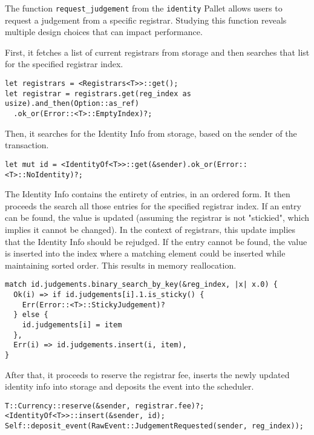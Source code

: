 \documentclass[11pt,a4paper]{article}
\begin{document}
The function \verb|request_judgement| from the \verb|identity| Pallet allows
users to request a judgement from a specific registrar. Studying this function
reveals multiple design choices that can impact performance.
\newline

First, it fetches a list of current registrars from storage and then searches
that list for the specified registrar index.

\begin{verbatim}
let registrars = <Registrars<T>>::get();
let registrar = registrars.get(reg_index as usize).and_then(Option::as_ref)
  .ok_or(Error::<T>::EmptyIndex)?;
\end{verbatim}

Then, it searches for the Identity Info from storage, based on the sender of the
transaction.

\begin{verbatim}
let mut id = <IdentityOf<T>>::get(&sender).ok_or(Error::<T>::NoIdentity)?;
\end{verbatim}

The Identity Info contains the entirety of entries, in an ordered form. It then
proceeds the search all those entries for the specified registrar index. If an
entry can be found, the value is updated (assuming the registrar is not
"stickied", which implies it cannot be changed). In the context of registrars,
this update implies that the Identity Info should be rejudged. If the entry
cannot be found, the value is inserted into the index where a matching element
could be inserted while maintaining sorted order. This results in memory
reallocation.

\begin{verbatim}
match id.judgements.binary_search_by_key(&reg_index, |x| x.0) {
  Ok(i) => if id.judgements[i].1.is_sticky() {
    Err(Error::<T>::StickyJudgement)?
  } else {
    id.judgements[i] = item
  },
  Err(i) => id.judgements.insert(i, item),
}
\end{verbatim}

After that, it proceeds to reserve the registrar fee, inserts the newly updated
identity info into storage and deposits the event into the scheduler.

\begin{verbatim}
T::Currency::reserve(&sender, registrar.fee)?;
<IdentityOf<T>>::insert(&sender, id);
Self::deposit_event(RawEvent::JudgementRequested(sender, reg_index));
\end{verbatim}
\end{document}
